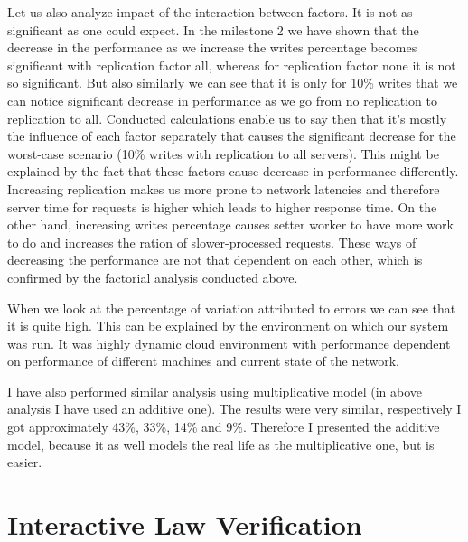 \documentclass[11pt]{article}
\begin{document}
Let us also analyze impact of the interaction between factors. It is not as significant as one could expect. In the milestone 2 we have shown that the decrease in the performance as we increase the writes percentage becomes significant with replication factor all, whereas for replication factor none it is not so significant. But also similarly we can see that it is only for 10\% writes that we can notice significant decrease in performance as we go from no replication to replication to all. Conducted calculations enable us to say then that it's mostly the influence of each factor separately that causes the significant decrease for the worst-case scenario (10\% writes with replication to all servers). This might be explained by the fact that these factors cause decrease in performance differently. Increasing replication makes us more prone to network latencies and therefore server time for requests is higher which leads to higher response time. On the other hand, increasing writes percentage causes setter worker to have more work to do and increases the ration of slower-processed requests. These ways of decreasing the performance are not that dependent on each other, which is confirmed by the factorial analysis conducted above.

When we look at the percentage of variation attributed to errors we can see that it is quite high. This can be explained by the environment on which our system was run. It was highly dynamic cloud environment with performance dependent on performance of different machines and current state of the network.

I have also performed similar analysis using multiplicative model (in above analysis I have used an additive one). The results were very similar, respectively I got approximately 43\%, 33\%, 14\% and 9\%. Therefore I presented the additive model, because it as well models the real life as the multiplicative one, but is easier.

\pagebreak

\section{Interactive Law Verification}\label{sec:interactive-law}

\end{document}

